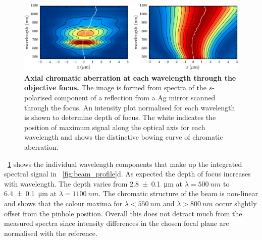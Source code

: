 \documentclass{article}
\begin{document}
\begin{figure}[bt]
\centering
\includegraphics{figures/axial_chromatic_aberration} %
\caption[Axial chromatic aberration at each wavelength through the objective focus]{\textbf{Axial chromatic aberration at each wavelength through the objective focus.} The image is formed from spectra of the $s$-polarised component of a reflection from a Ag mirror scanned through the focus. An intensity plot normalised for each wavelength is shown to determine depth of focus. The white indicates the position of maximum signal along the optical axis for each wavelength and shows the distinctive bowing curve of chromatic aberration.
}
\label{fig:axial_chromatic_aberration}
\vspace{-5pt}
\end{figure}

\figurename~\ref{fig:axial_chromatic_aberration} shows the individual wavelength components that make up the integrated spectral signal in \figurename~\ref{fig:beam_profile}d. As expected the depth of focus increases with wavelength. The depth varies from \SI{2.8\pm0.1}{\micro\metre} at $\lambda=\SI{500}{nm}$ to \SI{6.4\pm0.1}{\micro\metre} at $\lambda=\SI{1100}{nm}$. The chromatic structure of the beam is non-linear and shows that the colour maxima for $\lambda<\SI{550}{nm}$ and $\lambda>\SI{800}{nm}$ occur slightly offset from the pinhole position. Overall this does not detract much from the measured spectra since intensity differences in the chosen focal plane are normalised with the reference.
\end{document}
